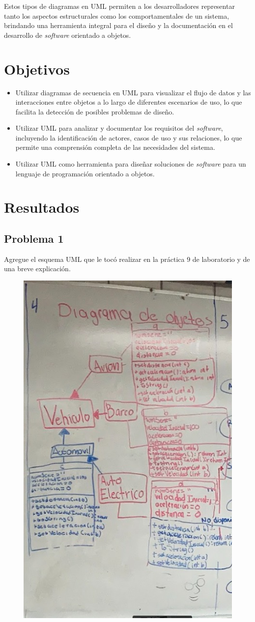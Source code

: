 \documentclass[11pt, twocolumn]{article}
\begin{document}
  Estos tipos de diagramas en UML permiten a los desarrolladores representar tanto los aspectos estructurales como los comportamentales de un sistema, brindando una herramienta integral para el diseño y la documentación en el desarrollo de \textit{software} orientado a objetos.

  \section*{Objetivos}
  \begin{itemize}
    \item Utilizar diagramas de secuencia en UML para visualizar el flujo de datos y las interacciones entre objetos a lo largo de diferentes escenarios de uso, lo que facilita la detección de posibles problemas de diseño.
    \item Utilizar UML para analizar y documentar los requisitos del \textit{software}, incluyendo la identificación de actores, casos de uso y sus relaciones, lo que permite una comprensión completa de las necesidades del sistema.
    \item Utilizar UML como herramienta para diseñar soluciones de \textit{software} para un lenguaje de programación orientado a objetos.
    
  \end{itemize}

  \section*{Resultados}
  \subsection*{Problema 1}
  Agregue el esquema UML que le tocó realizar en la práctica 9 de laboratorio y de una breve explicación.

  \begin{figure}[h!]
    \centering
    \includegraphics[width=0.56\linewidth]{9P1.jpg}
  \end{figure}
\end{document}
